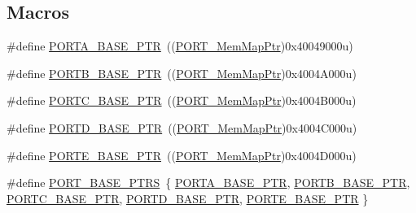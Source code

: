 \subsection*{Macros}
\begin{DoxyCompactItemize}
\item 
\#define \hyperlink{group___p_o_r_t___peripheral_gaa18ec7594fe603225220ec6eda4a19ce}{P\+O\+R\+T\+A\+\_\+\+B\+A\+S\+E\+\_\+\+P\+TR}~((\hyperlink{group___p_o_r_t___peripheral_ga0e26bafb7c17808f90278627bcbcaf8c}{P\+O\+R\+T\+\_\+\+Mem\+Map\+Ptr})0x40049000u)
\item 
\#define \hyperlink{group___p_o_r_t___peripheral_ga585b4782d1ceb44492289af0019480f9}{P\+O\+R\+T\+B\+\_\+\+B\+A\+S\+E\+\_\+\+P\+TR}~((\hyperlink{group___p_o_r_t___peripheral_ga0e26bafb7c17808f90278627bcbcaf8c}{P\+O\+R\+T\+\_\+\+Mem\+Map\+Ptr})0x4004\+A000u)
\item 
\#define \hyperlink{group___p_o_r_t___peripheral_ga03c740cdda17711afafc932723871474}{P\+O\+R\+T\+C\+\_\+\+B\+A\+S\+E\+\_\+\+P\+TR}~((\hyperlink{group___p_o_r_t___peripheral_ga0e26bafb7c17808f90278627bcbcaf8c}{P\+O\+R\+T\+\_\+\+Mem\+Map\+Ptr})0x4004\+B000u)
\item 
\#define \hyperlink{group___p_o_r_t___peripheral_ga7f5a263751543810ebfdbde278383276}{P\+O\+R\+T\+D\+\_\+\+B\+A\+S\+E\+\_\+\+P\+TR}~((\hyperlink{group___p_o_r_t___peripheral_ga0e26bafb7c17808f90278627bcbcaf8c}{P\+O\+R\+T\+\_\+\+Mem\+Map\+Ptr})0x4004\+C000u)
\item 
\#define \hyperlink{group___p_o_r_t___peripheral_gab166fe285bbb15b52de610f408fe25d3}{P\+O\+R\+T\+E\+\_\+\+B\+A\+S\+E\+\_\+\+P\+TR}~((\hyperlink{group___p_o_r_t___peripheral_ga0e26bafb7c17808f90278627bcbcaf8c}{P\+O\+R\+T\+\_\+\+Mem\+Map\+Ptr})0x4004\+D000u)
\item 
\#define \hyperlink{group___p_o_r_t___peripheral_ga54ff5179f8acaef2e1683cedfc0ef453}{P\+O\+R\+T\+\_\+\+B\+A\+S\+E\+\_\+\+P\+T\+RS}~\{ \hyperlink{group___p_o_r_t___peripheral_gaa18ec7594fe603225220ec6eda4a19ce}{P\+O\+R\+T\+A\+\_\+\+B\+A\+S\+E\+\_\+\+P\+TR}, \hyperlink{group___p_o_r_t___peripheral_ga585b4782d1ceb44492289af0019480f9}{P\+O\+R\+T\+B\+\_\+\+B\+A\+S\+E\+\_\+\+P\+TR}, \hyperlink{group___p_o_r_t___peripheral_ga03c740cdda17711afafc932723871474}{P\+O\+R\+T\+C\+\_\+\+B\+A\+S\+E\+\_\+\+P\+TR}, \hyperlink{group___p_o_r_t___peripheral_ga7f5a263751543810ebfdbde278383276}{P\+O\+R\+T\+D\+\_\+\+B\+A\+S\+E\+\_\+\+P\+TR}, \hyperlink{group___p_o_r_t___peripheral_gab166fe285bbb15b52de610f408fe25d3}{P\+O\+R\+T\+E\+\_\+\+B\+A\+S\+E\+\_\+\+P\+TR} \}
\end{DoxyCompactItemize}
